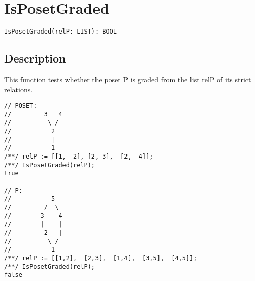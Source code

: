 \documentclass[a4paper]{mybook}
\newenvironment{command}{}{} %
\begin{document}
\section{IsPosetGraded}
\label{IsPosetGraded}
\begin{command} %


\begin{Verbatim}[label=syntax, rulecolor=\color{MidnightBlue},
frame=single]
IsPosetGraded(relP: LIST): BOOL 
\end{Verbatim}


\subsection*{Description}

This function tests whether the poset P is graded from the list relP of its strict relations.
\begin{Verbatim}[label=example, rulecolor=\color{PineGreen}, frame=single]
// POSET:
//         3   4
//          \ /
//           2
//           |
//           1
/**/ relP := [[1,  2], [2, 3],  [2,  4]];    
/**/ IsPosetGraded(relP);
true
    
// P:
//           5
//         /  \   
//        3    4
//        |    |
//         2   |
//          \ /
//           1
/**/ relP := [[1,2],  [2,3],  [1,4],  [3,5],  [4,5]];
/**/ IsPosetGraded(relP);
false
\end{Verbatim}


\end{command} %
\end{document}

